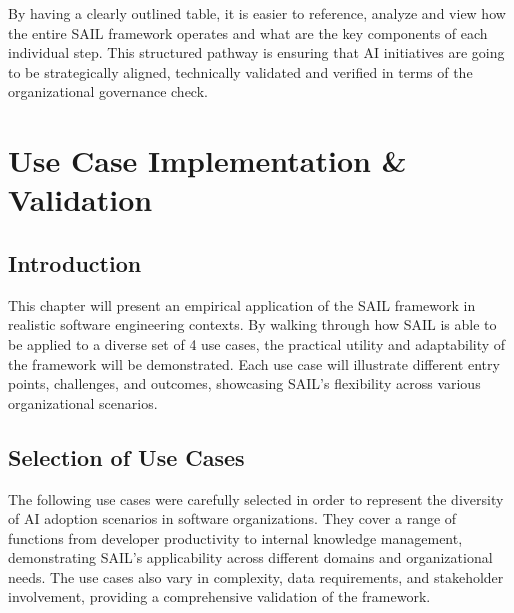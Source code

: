 \documentclass[]{imc-inf}
\begin{document}
By having a clearly outlined table, it is easier to reference, analyze and view how the entire SAIL framework operates and what are the key components of each individual step. This structured pathway is ensuring that AI initiatives are going to be strategically aligned, technically validated and verified in terms of the organizational governance check. 

\chapter{Use Case Implementation \&
	Validation}\label{use-case-implementation-validation}

\section{Introduction}\label{introduction-1}

This chapter will present an empirical application of the SAIL framework
in realistic software engineering contexts. By walking through how SAIL
is able to be applied to a diverse set of 4 use cases, the practical
utility and adaptability of the framework will be demonstrated. Each use
case will illustrate different entry points, challenges, and outcomes,
showcasing SAIL's flexibility across various organizational scenarios.

\section{Selection of Use Cases}\label{selection-of-use-cases}

The following use cases were carefully selected in order to represent
the diversity of AI adoption scenarios in software organizations. They
cover a range of functions from developer productivity to internal
knowledge management, demonstrating SAIL's applicability across
different domains and organizational needs. The use cases also vary in
complexity, data requirements, and stakeholder involvement, providing a
comprehensive validation of the framework.
\end{document}
